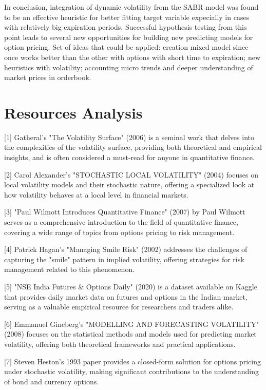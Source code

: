 \documentclass[a4paper,fleqn,12pt]{extarticle}
\begin{document}
	In conclusion, integration of dynamic volatility from the SABR model was found to be an effective heuristic for better fitting target variable expecially in cases with relatively big expiration periods. Successful hypothesis testing from this point leads to several new opportunities for building new predicting models for option pricing. Set of ideas that could be applied: creation mixed model since once works better than the other with options with short time to expiration; new heuristics with volatility; accounting micro trends and deeper understanding of market prices in orderbook.


	\newpage
	\section{Resources Analysis}
	[1] Gatheral's "The Volatility Surface" (2006) is a seminal work that delves into the complexities of the volatility surface, providing both theoretical and empirical insights, and is often considered a must-read for anyone in quantitative finance.

	[2] Carol Alexander's "STOCHASTIC LOCAL VOLATILITY" (2004) focuses on local volatility models and their stochastic nature, offering a specialized look at how volatility behaves at a local level in financial markets.

	[3] "Paul Wilmott Introduces Quantitative Finance" (2007) by Paul Wilmott serves as a comprehensive introduction to the field of quantitative finance, covering a wide range of topics from options pricing to risk management.
	
	[4] Patrick Hagan's "Managing Smile Risk" (2002) addresses the challenges of capturing the "smile" pattern in implied volatility, offering strategies for risk management related to this phenomenon.
	
	[5] "NSE India Futures \& Options Daily" (2020) is a dataset available on Kaggle that provides daily market data on futures and options in the Indian market, serving as a valuable empirical resource for researchers and traders alike.
	
	[6] Emmanuel Gincberg's "MODELLING AND FORECASTING VOLATILITY" (2008) focuses on the statistical methods and models used for predicting market volatility, offering both theoretical frameworks and practical applications.
	
	[7] Steven Heston's 1993 paper provides a closed-form solution for options pricing under stochastic volatility, making significant contributions to the understanding of bond and currency options.
	
\end{document}
